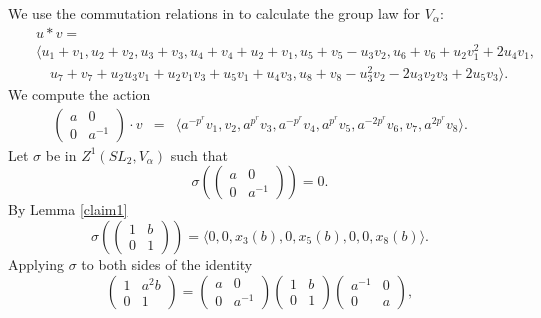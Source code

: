 \begin{example}
	We use the commutation relations in \cite[\S 33.3, \S 33.4]{humphreys1975linear} to calculate the group law for $V_\alpha$:
	\begin{eqnarray*}
		&&u * v =\\
		&&\langle
		u_1 + v_1,
		u_2 + v_2,
		u_3 + v_3,
		u_4 + v_4 + u_2 + v_1,
		u_5 + v_5 - u_3v_2,
		u_6 + v_6 + u_2v_1^2 + 2u_4v_1,\\
		&&\quad u_7 + v_7 + u_2u_3v_1 + u_2v_1v_3 + u_5v_1 + u_4v_3,
		u_8 + v_8 - u_3^2v_2 - 2u_3v_2v_3 + 2u_5v_3
		\rangle.
	\end{eqnarray*}
	We compute the action
	\begin{eqnarray*}
		\left(\begin{matrix} a & 0 \\ 0 & a^{-1} \end{matrix}\right)\cdot v
		&=&
		\langle 
		a^{-p^r}v_1,
		v_2,
		a^{p^r}v_3,
		a^{-p^r}v_4,
		a^{p^r}v_5,
		a^{-2p^r}v_6,
		v_7,
		a^{2p^r}v_8
		\rangle.
	\end{eqnarray*}
	Let $\sigma$ be in $Z^1(SL_2, V_\alpha)$ such that
	\begin{displaymath}
		\sigma\left(\left(\begin{matrix}a & 0\\0 & a^{-1}\end{matrix}\right)\right) = 0.
	\end{displaymath}
	By Lemma \ref{claim1}
	\begin{displaymath}
		\sigma\left(\left(\begin{matrix} 1 & b \\ 0 & 1 \end{matrix}\right)\right) =
		\langle 
		0,
		0,
		x_3(b),
		0,
		x_5(b),
		0,
		0,
		x_8(b)
		\rangle.
	\end{displaymath}
	Applying $\sigma$ to both sides of the identity
	\begin{displaymath}
		\left(\begin{matrix} 1 & a^2b \\ 0 & 1 \end{matrix}\right)
		= 
		\left(\begin{matrix} a & 0 \\ 0 & a^{-1} \end{matrix}\right)
		\left(\begin{matrix} 1 & b \\ 0 & 1 \end{matrix}\right)
		\left(\begin{matrix} a^{-1} & 0 \\ 0 & a \end{matrix}\right),

\end{displaymath}
\end{example}
